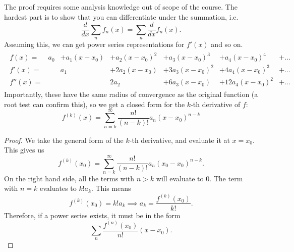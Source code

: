 The proof requires some analysis knowledge out of scope of the course. The hardest part is to show that you can differentiate under the summation, i.e. \[
\frac{d}{dx}\sum_n {f_n(x)} = \sum_n \frac{d}{dx} f_n(x).
\]
Assuming this, we can get power series representations for $f'(x)$ and so on.
\begin{align*}
    \begin{array}{ccccccc}
    f(x) =&  a_0 &+ a_1(x-x_0) &+ a_2(x-x_0)^2 &+a_3(x-x_0)^3&+a_4(x-x_0)^4& +\ldots \\
    f'(x)=&   &a_1 &+ 2a_2(x-x_0) &+ 3a_3(x-x_0)^2 &+4a_4(x-x_0)^3 &+\ldots \\
    f''(x)=& &   &2a_2 &+ 6a_3(x-x_0) &+ 12a_4(x-x_0)^2&+\ldots
    \end{array}
\end{align*}
Importantly, these have the same radius of convergence as the original function (a root test can confirm this), so we get a closed form for the $k$-th derivative of $f$:
\[f^{(k)}(x) = \sum_{n=k}^{\infty} \frac{n!}{(n-k)!}a_n(x-x_0)^{n-k} \] 


\begin{proof}
    We take the general form of the $k$-th derivative, and evaluate it at $x=x_0$.
    This gives us \[
    f^{(k)}(x_0)=\sum_{n=k}^{\infty} \frac{n!}{(n-k)!}a_n(x_0-x_0)^{n-k}.
    \]
    On the right hand side, all the terms with $n>k$ will evaluate to $0$. The term with $n=k$ evaluates to $k!a_k$. This means \[
    f^{(k)}(x_0) = k! a_k \implies a_k = \frac{f^{(k)}(x_0)}{k!}.
    \]
    Therefore, if a power series exists, it must be in the form \[
    \sum_n \frac{f^{(n)}(x_0)}{n!} (x-x_0).
    \]
\end{proof}


